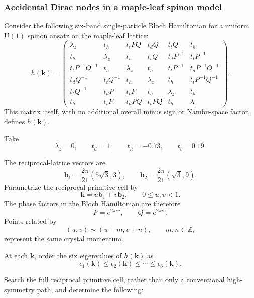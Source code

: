 \subsubsection{Accidental Dirac nodes in a maple-leaf spinon model}
\label{problem:maple-leaf-dirac-nodes}
Consider the following six-band single-particle Bloch Hamiltonian for a
uniform $\mathrm{U}(1)$ spinon ansatz on the maple-leaf lattice:
\[
h(\mathbf{k})=
\begin{pmatrix}
\lambda_z
    & t_h
    & t_tPQ
    & t_dQ
    & t_tQ
    & t_h
\\
t_h
    & \lambda_z
    & t_h
    & t_tQ
    & t_dP^{-1}
    & t_tP^{-1}
\\
t_tP^{-1}Q^{-1}
    & t_h
    & \lambda_z
    & t_h
    & t_tP^{-1}
    & t_dP^{-1}Q^{-1}
\\
t_dQ^{-1}
    & t_tQ^{-1}
    & t_h
    & \lambda_z
    & t_h
    & t_tP^{-1}Q^{-1}
\\
t_tQ^{-1}
    & t_dP
    & t_tP
    & t_h
    & \lambda_z
    & t_h
\\
t_h
    & t_tP
    & t_dPQ
    & t_tPQ
    & t_h
    & \lambda_z
\end{pmatrix}.
\]
This matrix itself, with no additional overall minus sign or
Nambu-space factor, defines $h(\mathbf{k})$.

Take
\[
\lambda_z=0,
\qquad
t_d=1,
\qquad
t_h=-0.73,
\qquad
t_t=0.19.
\]

The reciprocal-lattice vectors are
\[
\mathbf{b}_1=\frac{2\pi}{21}(5\sqrt{3},3),
\qquad
\mathbf{b}_2=\frac{2\pi}{21}(\sqrt{3},9).
\]
Parametrize the reciprocal primitive cell by
\[
\mathbf{k}=u\mathbf{b}_1+v\mathbf{b}_2,
\qquad
0\leq u,v<1.
\]
The phase factors in the Bloch Hamiltonian are therefore
\[
P=e^{2\pi i u},
\qquad
Q=e^{2\pi i v}.
\]
Points related by
\[
(u,v)\sim(u+m,v+n),
\qquad m,n\in\mathbb{Z},
\]
represent the same crystal momentum.

At each $\mathbf{k}$, order the six eigenvalues of $h(\mathbf{k})$ as
\[
\epsilon_1(\mathbf{k})
\leq \epsilon_2(\mathbf{k})
\leq\cdots\leq
\epsilon_6(\mathbf{k}).
\]

Search the full reciprocal primitive cell, rather than only a
conventional high-symmetry path, and determine the following:

